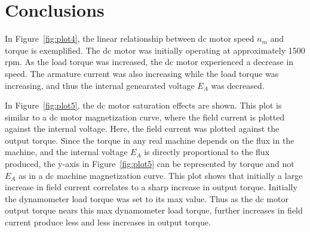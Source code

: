 \documentclass{article}
\begin{document}
\section*{Conclusions}

In Figure~\ref{fig:plot4}, the linear relationship between dc motor speed $n_m$ and torque \tau is exemplified.
The dc motor was initially operating at approximately 1500 rpm. As the load torque was increased, the
dc motor experienced a decrease in speed. The armature current was also increasing while the load torque
was increasing, and thus the internal genearated voltage $E_A$ was decreased.

In Figure~\ref{fig:plot5}, the dc motor saturation effects are shown. This plot is similar to a dc motor
magnetization curve, where the field current is plotted against the internal voltage. Here, the field current was
plotted against the output torque. Since the torque in any real machine depends on the flux in the machine, 
and the internal voltage $E_A$ is directly proportional to the flux produced, the y-axis in Figure~\ref{fig:plot5}
can be represented by torque and not $E_A$ as in a dc machine magnetization curve. This plot shows that initially
a large increase in field current correlates to a sharp increase in output torque. Initially the dynamometer load
torque was set to its max value. Thus as the dc motor output torque nears this max dynamometer load torque, 
further increases in field current produce less and less increases in output torque.
\end{document}
